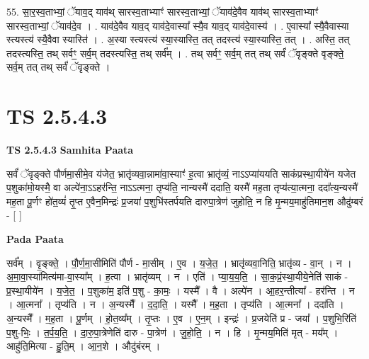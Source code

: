\documentclass[17pt]{extarticle}
\begin{document}
55. सा॒र॒स्व॒ताभ्यां॒ ॅयाव॒द् याव॑थ् सारस्व॒ताभ्याꣳ॑ सारस्व॒ताभ्यां॒ ॅयाव॑दे॒वैव याव॑थ् सारस्व॒ताभ्याꣳ॑ सारस्व॒ताभ्यां॒ ॅयाव॑दे॒व । . याव॑दे॒वैव याव॒द् याव॑दे॒वास्या᳚ स्यै॒व याव॒द् याव॑दे॒वास्य॑ । . ए॒वास्या᳚ स्यै॒वैवास्या स्त्यस्त्य॑ स्यै॒वैवा स्यास्ति॑ । . अ॒स्या स्त्यस्त्य॑ स्या॒स्यास्ति॒ तत् तदस्त्य॑ स्या॒स्यास्ति॒ तत् । . अस्ति॒ तत् तदस्त्यस्ति॒ तथ् सर्वꣳ॒॒ सर्व॒म् तदस्त्यस्ति॒ तथ् सर्व᳚म् । . तथ् सर्वꣳ॒॒ सर्व॒म् तत् तथ् सर्वं॑ ॅवृङ्क्ते वृङ्क्ते॒ सर्व॒म् तत् तथ् सर्वं॑ ॅवृङ्क्ते । \newline
\pagebreak
{}

\section{ TS 2.5.4.3 }

\textbf{TS 2.5.4.3 } \newline
\textbf{Samhita Paata} \newline

सर्वं॑ ॅवृङ्क्ते पौर्णमा॒सीमे॒व य॑जेत॒ भ्रातृ॑व्यवा॒न्नामा॑वा॒स्याꣳ॑ ह॒त्वा भ्रातृ॑व्यं॒ नाऽऽप्या॑ययति साकंप्रस्था॒यीये॑न यजेत प॒शुका॑मो॒यस्मै॒ वा अल्पे॑ना॒ऽऽहर॑न्ति॒ नाऽऽत्मना॒ तृप्य॑ति॒ नान्यस्मै॑ ददाति॒ यस्मै॑ मह॒ता तृप्य॑त्या॒त्मना॒ ददा᳚त्य॒न्यस्मै॑ मह॒ता पू॒र्णꣳ हो॑त॒व्यं॑ तृ॒प्त ए॒वैन॒मिन्द्रः॑ प्र॒जया॑ प॒शुभि॑स्तर्पयति दारुपा॒त्रेण॑ जुहोति॒ न हि मृ॒न्मय॒माहु॑तिमान॒श औदु॑म्बरं - [  ] \newline

\textbf{Pada Paata} \newline

सर्व᳚म् । वृ॒ङ्क्ते॒ । पौ॒र्ण॒मा॒सीमिति॑ पौर्ण - मा॒सीम् । ए॒व । य॒जे॒त॒ । भ्रातृ॑व्यवा॒निति॒ भ्रातृ॑व्य - वा॒न् । न । अ॒मा॒वा॒स्या॑मित्य॑मा-वा॒स्या᳚म् । ह॒त्वा । भ्रातृ॑व्यम् । न । एति॑ । प्या॒य॒य॒ति॒ । सा॒क॒प्रं॒स्था॒यीये॒नेति॑ साकं - प्र॒स्था॒यीये॑न । य॒जे॒त॒ । प॒शुका॑म॒ इति॑ प॒शु - का॒मः॒ । यस्मै᳚ । वै । अल्पे॑न । आ॒हर॒न्तीत्या᳚ - हर॑न्ति । न । आ॒त्मना᳚ । तृप्य॑ति । न । अ॒न्यस्मै᳚ । द॒दा॒ति॒ । यस्मै᳚ । म॒ह॒ता । तृप्य॑ति । आ॒त्मना᳚ । ददा॑ति । अ॒न्यस्मै᳚ । म॒ह॒ता । पू॒र्णम् । हो॒त॒व्य᳚म् । तृ॒प्तः । ए॒व । ए॒न॒म् । इन्द्रः॑ । प्र॒जयेति॑ प्र - जया᳚ । प॒शुभि॒रिति॑ प॒शु-भिः॒ । त॒र्प॒य॒ति॒ । दा॒रु॒पा॒त्रेणेति॑ दारु - पा॒त्रेण॑ । जु॒हो॒ति॒ । न । हि । मृ॒न्मय॒मिति॑ मृत् - मय᳚म् । आहु॑ति॒मित्या - हु॒ति॒म् । आ॒न॒शे । औदु॑बंरम् ।  \newline
\end{document}
